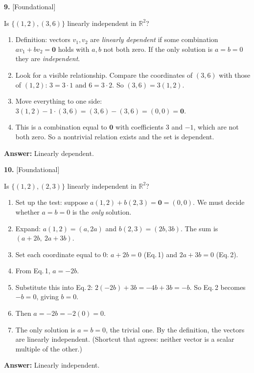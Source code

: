 \documentclass[11pt]{article}
\begin{document}
\begin{minipage}{\linewidth}\textbf{9.} \hfill{\scriptsize\color{ink}[Foundational]}\par\nopagebreak Is $\{(1,2),(3,6)\}$ linearly independent in $\mathbb{R}^{2}$?
\end{minipage}\par\nopagebreak
\begin{tcolorbox}[breakable,colback=ans,colframe=ansb,boxrule=0.5pt,left=4pt,right=4pt,top=2pt,bottom=2pt]\begin{enumerate}[leftmargin=2.2em,itemsep=1pt,topsep=1pt,label=\textbf{Step \arabic*.}]\item Definition: vectors $v_1,v_2$ are \emph{linearly dependent} if some combination $a v_1+b v_2=\mathbf 0$ holds with $a,b$ not both zero. If the only solution is $a=b=0$ they are \emph{independent}.
\item Look for a visible relationship. Compare the coordinates of $(3,6)$ with those of $(1,2)$: $3=3\cdot1$ and $6=3\cdot2$. So $(3,6)=3(1,2)$.
\item Move everything to one side: $3(1,2)-1\cdot(3,6)=(3,6)-(3,6)=(0,0)=\mathbf 0$.
\item This is a combination equal to $\mathbf 0$ with coefficients $3$ and $-1$, which are not both zero. So a nontrivial relation exists and the set is dependent.
\end{enumerate}\textbf{Answer:} Linearly dependent.\end{tcolorbox}
\par\vspace{2pt}
\begin{minipage}{\linewidth}\textbf{10.} \hfill{\scriptsize\color{ink}[Foundational]}\par\nopagebreak Is $\{(1,2),(2,3)\}$ linearly independent in $\mathbb{R}^{2}$?
\end{minipage}\par\nopagebreak
\begin{tcolorbox}[breakable,colback=ans,colframe=ansb,boxrule=0.5pt,left=4pt,right=4pt,top=2pt,bottom=2pt]\begin{enumerate}[leftmargin=2.2em,itemsep=1pt,topsep=1pt,label=\textbf{Step \arabic*.}]\item Set up the test: suppose $a(1,2)+b(2,3)=\mathbf 0=(0,0)$. We must decide whether $a=b=0$ is the \emph{only} solution.
\item Expand: $a(1,2)=(a,2a)$ and $b(2,3)=(2b,3b)$. The sum is $(a+2b,\ 2a+3b)$.
\item Set each coordinate equal to $0$: $a+2b=0$ \quad (Eq.\,1) and \quad $2a+3b=0$ \quad (Eq.\,2).
\item From Eq.\,1, $a=-2b$.
\item Substitute this into Eq.\,2: $2(-2b)+3b=-4b+3b=-b$. So Eq.\,2 becomes $-b=0$, giving $b=0$.
\item Then $a=-2b=-2(0)=0$.
\item The only solution is $a=b=0$, the trivial one. By the definition, the vectors are linearly independent. (Shortcut that agrees: neither vector is a scalar multiple of the other.)
\end{enumerate}\textbf{Answer:} Linearly independent.\end{tcolorbox}
\end{document}
